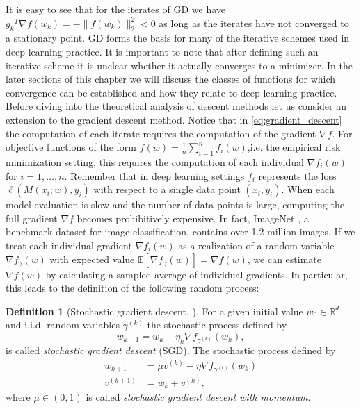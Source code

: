 \documentclass[12pt]{article}
\theoremstyle{definition}
\newtheorem{definition}[definition]{Definition}
\numberwithin{equation}{section}
\newcommand{\ev}[1]{\mathbb{E}\left[{#1}\right]}
\newcommand{\norm}[1]{\lVert{#1}\rVert_2}
\begin{document}
It is easy to see that for the iterates of GD we have ${g_k}^T \nabla f(w_{k}) = -\norm{ f(w_{k}) }^2 < 0$ as long as the iterates have not converged to a stationary point. GD forms the basis for many of the iterative schemes used in deep learning practice. It is important to note that after defining such an iterative scheme it is unclear whether it actually converges to a minimizer. In the later sections of this chapter we will discuss the classes of functions for which convergence can be established and how they relate to deep learning practice. Before diving into the theoretical analysis of descent methods let us consider an extension to the gradient descent method.
Notice that in \eqref{eq:gradient_descent} the computation of each iterate requires the computation of the gradient $\nabla f$. For objective functions of the form $f(w) = \frac{1}{n} \sum_{i=1}^n f_i(w)$,i.e. the empirical risk minimization setting, this requires the computation of each individual $\nabla f_i(w)$ for $i = 1, \dots, n$. Remember that in deep learning settings $f_i$ represents the loss $\ell(M(x_i;w), y_i)$ with respect to a single data point $(x_i, y_i)$. When each model evaluation is slow and the number of data points is large, computing the full gradient $\nabla f$ becomes prohibitively expensive. In fact, ImageNet \cite{dengImageNetLargescaleHierarchical2009}, a benchmark dataset for image classification, contains over 1.2 million images. If we treat each individual gradient $\nabla f_i(w)$ as a realization of a random variable $\nabla f_{\gamma}(w)$ with expected value $\ev{\nabla f_{\gamma}(w)} = \nabla f(w)$, we can estimate $\nabla f(w)$ by calculating a sampled average of individual gradients. In particular, this leads to the definition of the following random process:
\begin{definition}[Stochastic gradient descent, ]
  \label{def:sgd}
  For a given initial value $w_{0} \in \mathbb{R}^d$ and i.i.d. random variables $\gamma^{(k)}$ the stochastic process defined by
  \begin{equation}
    \label{eq:stochastic_gradient_descent}
    w_{k+1} = w_{k} - \eta_k \nabla f_{\gamma^{(k)}}(w_{k}),
  \end{equation}
  is called \emph{stochastic gradient descent} (SGD).
  The stochastic process defined by
  \begin{align*}
    w_{k+1} &= \mu v^{(k)} - \eta \nabla f_{\gamma^{(k)}}(w_{k}) \\
    v^{(k+1)} &= w_{k} + v^{(k)},
  \end{align*}
  where $\mu \in (0,1)$ is called \emph{stochastic gradient descent with momentum}. 
\end{definition}
\end{document}

